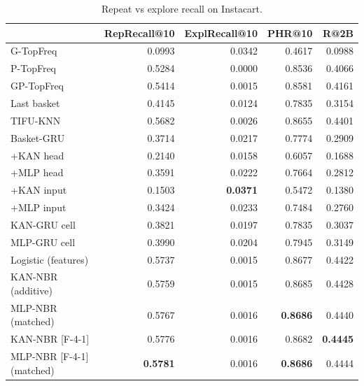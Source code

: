 \begin{table}[H]
\centering\small
\caption{Repeat vs explore recall on Instacart.}
\label{tab:repeat_instacart}
\begin{tabular}{lrrrr}
\toprule
 & RepRecall@10 & ExplRecall@10 & PHR@10 & R@2B \\
\midrule
G-TopFreq & 0.0993 & 0.0342 & 0.4617 & 0.0988 \\
P-TopFreq & 0.5284 & 0.0000 & 0.8536 & 0.4066 \\
GP-TopFreq & 0.5414 & 0.0015 & 0.8581 & 0.4161 \\
Last basket & 0.4145 & 0.0124 & 0.7835 & 0.3154 \\
TIFU-KNN & 0.5682 & 0.0026 & 0.8655 & 0.4401 \\
Basket-GRU & 0.3714 & 0.0217 & 0.7774 & 0.2909 \\
+KAN head & 0.2140 & 0.0158 & 0.6057 & 0.1688 \\
+MLP head & 0.3591 & 0.0222 & 0.7664 & 0.2812 \\
+KAN input & 0.1503 & \textbf{0.0371} & 0.5472 & 0.1380 \\
+MLP input & 0.3424 & 0.0233 & 0.7484 & 0.2760 \\
KAN-GRU cell & 0.3821 & 0.0197 & 0.7835 & 0.3037 \\
MLP-GRU cell & 0.3990 & 0.0204 & 0.7945 & 0.3149 \\
Logistic (features) & 0.5737 & 0.0015 & 0.8677 & 0.4422 \\
KAN-NBR (additive) & 0.5759 & 0.0015 & 0.8685 & 0.4428 \\
MLP-NBR (matched) & 0.5767 & 0.0016 & \textbf{0.8686} & 0.4440 \\
KAN-NBR [F-4-1] & 0.5776 & 0.0016 & 0.8682 & \textbf{0.4445} \\
MLP-NBR [F-4-1] (matched) & \textbf{0.5781} & 0.0016 & \textbf{0.8686} & 0.4444 \\
\bottomrule
\end{tabular}
\end{table}
